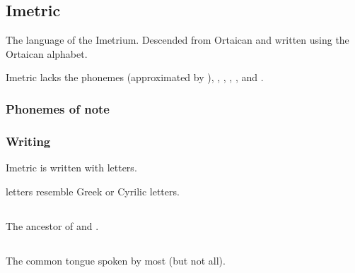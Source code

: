 \subsection{Imetric}
The language of the Imetrium. 
Descended from Ortaican and written using the Ortaican alphabet. 

Imetric lacks the phonemes \txipa{[b]} (approximated by \txipa{[v]}), \txipa{[T]}, \txipa{[x]}, \txipa{[\c c]}, \txipa{[S]}, \txipa{[z]} and \txipa{[Z]}. 









\begin{pronunciationenvironment}{\subsubsection{Phonemes of note}}
\end{pronunciationenvironment}





\subsubsection{Writing}
Imetric is written with {\Ortaican{} letters}. 

\Ortaican{} letters resemble Greek or Cyrilic letters. 









\subsection{\Ortaican}
The ancestor of  and . 









\subsection{\Resphan}
The common tongue spoken by most \resphain{} (but not all). 

